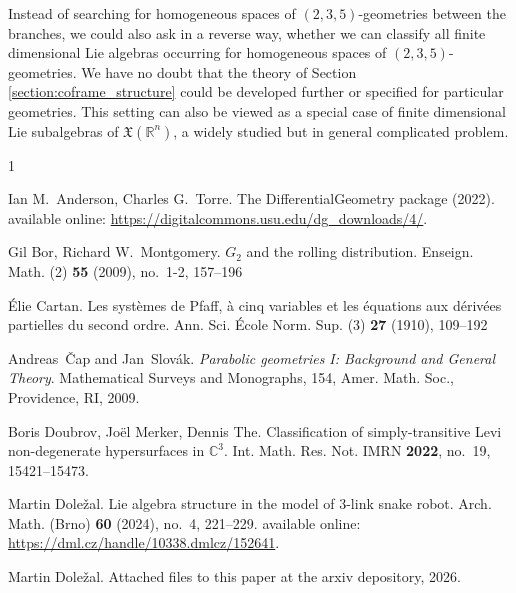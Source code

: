 \documentclass{amsart}
\theoremstyle{plain}
\theoremstyle{definition}
\theoremstyle{remark}
\newcommand{\R}{\mathbb{R}}
\newcommand{\mfk}[1]{\mathfrak{#1}}
\begin{document}
Instead of searching for homogeneous spaces of $(2,3,5)$-geometries between the branches, we could also ask in a reverse way, whether we can classify all finite dimensional Lie algebras occurring for homogeneous spaces of $(2,3,5)$-geometries. We have no doubt that the theory of Section \ref{section:coframe_structure} could be developed further or specified for particular geometries. This setting can also be viewed as a special case of finite dimensional Lie subalgebras of $\mfk{X}(\R^n)$, a widely studied but in general complicated problem.

%
\nocite{*}
% 

\begin{thebibliography}{1}

Ian M.~Anderson, Charles G.~Torre.
\newblock The DifferentialGeometry package (2022).
\newblock available online: \url{https://digitalcommons.usu.edu/dg_downloads/4/}.

Gil Bor, Richard W.~Montgomery.
\newblock $G_2$ and the rolling distribution.
\newblock Enseign. Math. (2) {\bf 55} (2009), no.~1-2, 157--196

\'Elie Cartan.
\newblock Les syst{\`e}mes de Pfaff, {\`a} cinq variables et les {\'e}quations
  aux d{\'e}riv{\'e}es partielles du second ordre.
\newblock Ann. Sci. \'Ecole Norm. Sup. (3) {\bf 27} (1910), 109--192

Andreas~{\v{C}}ap and Jan~Slov{\'a}k.
\newblock \emph{Parabolic geometries I: Background and General Theory}.
\newblock Mathematical Surveys and Monographs, 154, Amer. Math. Soc., Providence, RI, 2009.

Boris Doubrov, Joël Merker, Dennis The.
\newblock Classification of simply-transitive Levi non-degenerate hypersurfaces in $\mathbb{C}^3$.
\newblock Int. Math. Res. Not. IMRN {\bf 2022}, no.~19, 15421--15473.

Martin Dole\v{z}al.
\newblock Lie algebra structure in the model of 3-link snake robot.
\newblock Arch. Math. (Brno) {\bf 60} (2024), no.~4, 221--229.
\newblock available online: \url{https://dml.cz/handle/10338.dmlcz/152641}.

Martin Dole\v{z}al.
\newblock Attached files to this paper at the arxiv depository, 2026.


\end{thebibliography}
\end{document}
